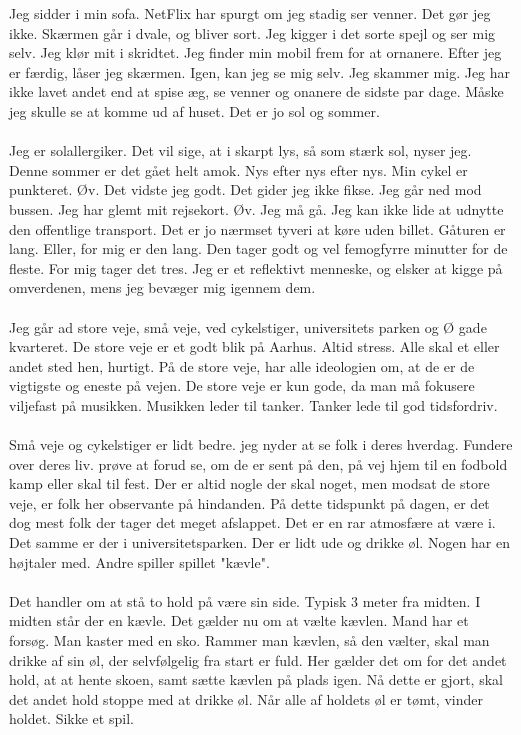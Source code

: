 \documentclass[]{article}
\begin{document}
Jeg sidder i min sofa. NetFlix har spurgt om jeg stadig ser venner. Det gør jeg ikke. Skærmen går i dvale, og bliver sort. Jeg kigger i det sorte spejl og ser mig selv. Jeg klør mit i skridtet. Jeg finder min mobil frem for at ornanere. Efter jeg er færdig, låser jeg skærmen. Igen, kan jeg se mig selv. Jeg skammer mig. Jeg har ikke lavet andet end at spise æg, se venner og onanere de sidste par dage. Måske jeg skulle se at komme ud af huset. Det er jo sol og sommer.
\\ \\
Jeg er solallergiker. Det vil sige, at i skarpt lys, så som stærk sol, nyser jeg. Denne sommer er det gået helt amok. Nys efter nys efter nys. Min cykel er punkteret. Øv. Det vidste jeg godt. Det gider jeg ikke fikse. Jeg går ned mod bussen. Jeg har glemt mit rejsekort. Øv. Jeg må gå. Jeg kan ikke lide at udnytte den offentlige transport. Det er jo nærmset tyveri at køre uden billet. Gåturen er lang. Eller, for mig er den lang. Den tager godt og vel femogfyrre minutter for de fleste. For mig tager det tres. Jeg er et reflektivt menneske, og elsker at kigge på omverdenen, mens jeg bevæger mig igennem dem.
\\ \\
Jeg går ad store veje, små veje, ved cykelstiger, universitets parken og Ø gade kvarteret. De store veje er et godt blik på Aarhus. Altid stress. Alle skal et eller andet sted hen, hurtigt. På de store veje, har alle ideologien om, at de er de vigtigste og eneste på vejen. De store veje er kun gode, da man må fokusere viljefast på musikken. Musikken leder til tanker. Tanker lede til god tidsfordriv. 
\\ \\
Små veje og cykelstiger er lidt bedre. jeg nyder at se folk i deres hverdag. Fundere over deres liv. prøve at forud se, om de er sent på den, på vej hjem til en fodbold kamp eller skal til fest. Der er altid nogle der skal noget, men modsat de store veje, er folk her observante på hindanden. På dette tidspunkt på dagen, er det dog mest folk der tager det meget afslappet. Det er en rar atmosfære at være i. Det samme er der i universitetsparken. Der er lidt ude og drikke øl. Nogen har en højtaler med. Andre spiller spillet "kævle". 
\\ \\
Det handler om at stå to hold på være sin side. Typisk 3 meter fra midten. I midten står der en kævle. Det gælder nu om at vælte kævlen. Mand har et forsøg. Man kaster med en sko. Rammer man kævlen, så den vælter, skal man drikke af sin øl, der selvfølgelig fra start er fuld. Her gælder det om for det andet hold, at at hente skoen, samt sætte kævlen på plads igen. Nå dette er gjort, skal det andet hold stoppe med at drikke øl. Når alle af holdets øl er tømt, vinder holdet. Sikke et spil.
\end{document}
